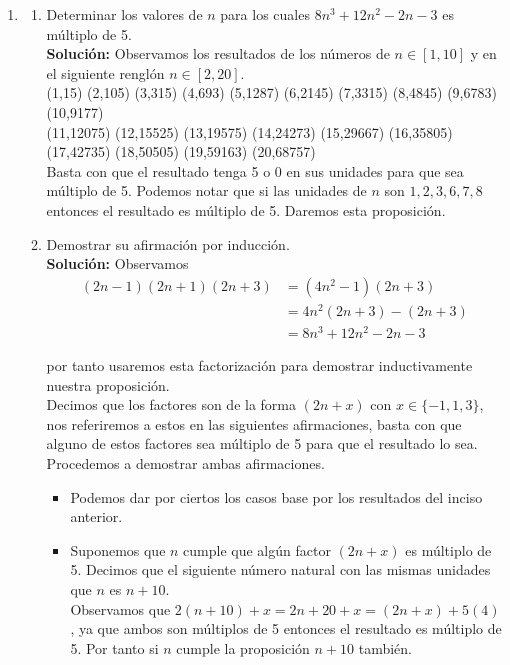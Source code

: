 \documentclass[10pt,letterpaper,fleqn]{article}
\begin{document}
    \begin{enumerate}

        \item \begin{enumerate}

            \item Determinar los valores de $n$ para los cuales $8n^3 + 12n^2 - 2n - 3$ es múltiplo de 5.\\
            \textbf{Solución: } Observamos los resultados de los números de $n\in [1,10]$ y en el siguiente renglón $n\in[2,20]$. \\
            (1,15) (2,105) (3,315) (4,693) (5,1287) (6,2145) (7,3315) (8,4845) (9,6783) (10,9177) \\ 
            (11,12075) (12,15525) (13,19575) (14,24273) (15,29667) (16,35805) (17,42735) (18,50505) (19,59163) (20,68757) \\ 
            Basta con que el resultado tenga 5 o 0 en sus unidades para que sea múltiplo de 5. Podemos notar que si las unidades de $n$ son $1,2,3,6,7,8$ entonces el resultado es múltiplo de 5. Daremos esta proposición.
            
            \item Demostrar su afirmación por inducción.\\
            \textbf{Solución: } Observamos
            \begin{equation*}
                \begin{split}
                    (2n - 1)(2n + 1)(2n + 3) & = (4n^2-1)(2n+3)\\
                                             & = 4n^2(2n+3) - (2n+3) \\
                                             & = 8n^3 + 12n^2 - 2n -3
                \end{split}
            \end{equation*}

            por tanto usaremos esta factorización para demostrar inductivamente nuestra proposición. \\
            Decimos que los factores son de la forma $(2n+x)$ con $x\in\{-1,1,3\}$, nos referiremos a estos en las siguientes afirmaciones, basta con que alguno de estos factores sea múltiplo de 5 para que el resultado lo sea. Procedemos a demostrar ambas afirmaciones.
            \begin{itemize}
                \item Podemos dar por ciertos los casos base por los resultados del inciso anterior.
                \item Suponemos que $n$ cumple que algún factor $(2n+x)$ es múltiplo de 5. Decimos que el siguiente número natural con las mismas unidades que $n$ es $n+10$. \\
                Observamos que $2(n+10)+x=2n+20+x=(2n+x)+5(4)$, ya que ambos son múltiplos de 5 entonces el resultado es múltiplo de 5. Por tanto si $n$ cumple la proposición $n+10$ también.
            \end{itemize}


\end{enumerate}
\end{enumerate}
\end{document}
